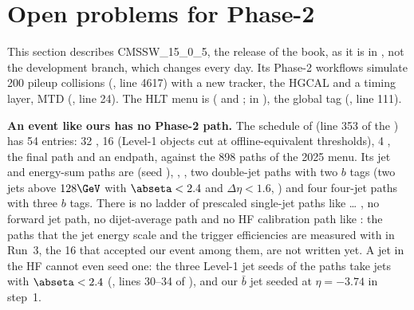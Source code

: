 \FloatBarrier
\section{Open problems for Phase-2}

This section describes CMSSW\_15\_0\_5, the release of the book, as it is in , not the
development branch, which changes every day. Its Phase-2 workflows simulate 200 pileup collisions
(, line 4617) with a new tracker, the HGCAL and a timing
layer, MTD (, line 24). The HLT menu is 
( and ;  in
), the global tag 
(, line 111).

\textbf{An event like ours has no Phase-2 path.} The schedule of  (line 353 of the ) has 54
entries: 32 , 16  (Level-1 objects cut at offline-equivalent thresholds), 4 , the
final path and an endpath, against the 898 paths of the 2025 menu. Its jet and energy-sum paths are
 (seed ), ,
, two double-jet paths with two $b$ tags (two jets above $128\GeV$ with
$\abseta<2.4$ and $\Delta\eta<1.6$, ) and four four-jet paths with three
$b$ tags. There is no ladder of prescaled single-jet paths like  \ldots{} , no forward jet
path, no dijet-average path and no HF calibration path like : the paths that the jet
energy scale and the trigger efficiencies are measured with in Run~3, the 16 that accepted our event among them, are not
written yet. A jet in the HF cannot even seed one: the three Level-1 jet seeds of the paths take jets with $\abseta<2.4$
(, lines 30--34 of
), and our
$\bar{b}$ jet seeded  at $\eta=-3.74$ in step~1.

